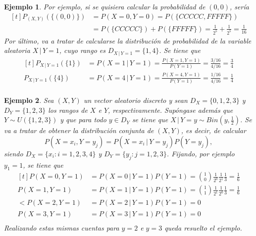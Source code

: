 \documentclass[11pt]{report}
\theoremstyle{mytheorem}
\theoremstyle{mydefinition}
\theoremstyle{myexample}
\newtheorem*{example}{Ejemplo}
\begin{document}
\begin{example}
Por ejemplo, si se quisiera calcular la probabilidad de $(0,0)$, sería
\[
\begin{aligned}[t]
P_{(X,Y)}(\{(0,0)\}) &= P(X=0,Y=0) = P(\{CCCCC,FFFFF\}) \\
&= P(\{CCCCC\})+P(\{FFFFF\}) = \frac{1}{2^5}+\frac{1}{2^5} = \frac{1}{16}
\end{aligned}
\]
Por último, va a tratar de calcularse la distribución de probabilidad de la variable aleatoria $X \, | \, Y=1$, cuyo rango es $D_{X \, | \, Y = 1} = \{1,4\}$. Se tiene que
\[\begin{aligned}[t]
    P_{X \, |\,Y=1}(\{1\}) &= P(X=1 \, | \, Y=1) = \frac{P(X=1,Y=1)}{P(Y=1)} = \frac{3/16}{4/16} = \frac{3}{4} \\[5pt]
    P_{X \, |\,Y=1}(\{4\}) &= P(X=4 \, | \, Y=1) = \frac{P(X=4,Y=1)}{P(Y=1)} = \frac{1/16}{4/16} = \frac{1}{4} \\
\end{aligned}\]
\end{example}

\begin{example}
Sea $(X,Y)$ un vector aleatorio discreto y sean $D_X=\{0,1,2,3\}$ y $D_Y = \{1,2,3\}$ los rangos de $X$ e $Y$, respectivamente. Supóngase además que $Y \sim U(\{1,2,3\})$ y que para todo $y \in D_Y$ se tiene que $X \, | \, Y = y \sim Bin(y,\frac{1}{2})$. Se va a tratar de obtener la distribución conjunta de $(X,Y)$, es decir, de calcular
\[P(X=x_i,Y=y_j) = P(X=x_i \, | \, Y=y_j)P(Y=y_j),\]
siendo $D_X=\{x_i \colon i =1,2,3,4\}$ y $D_Y=\{y_j \colon j=1,2,3\}$. Fijando, por ejemplo $y_1=1$, se tiene que
\[\begin{aligned}[t]
    P(X=0,Y=1) &= P(X=0 \, | \, Y=1)P(Y=1) = {1 \choose 0} \frac{1}{2^0} \frac{1}{2^1} \frac{1}{3} = \frac{1}{6} \\
    P(X=1,Y=1) &= P(X=1 \, | \, Y=1)P(Y=1) = {1 \choose 1} \frac{1}{2^1} \frac{1}{2^0} \frac{1}{3} = \frac{1}{6} \\
<    P(X=2,Y=1) &= P(X=2 \, | \, Y=1)P(Y=1) = 0\phantom{\frac{1}{1}} \\
    P(X=3,Y=1) &= P(X=3 \, | \, Y=1)P(Y=1) = 0\phantom{\frac{1}{1}} \\
\end{aligned}\]
Realizando estas mismas cuentas para $y=2$ e $y=3$ queda resuelto el ejemplo.
\end{example}
\end{document}

